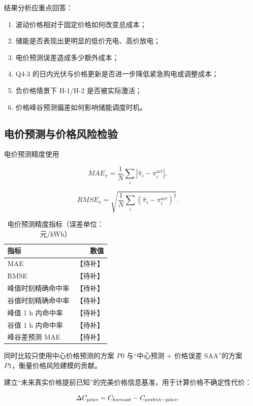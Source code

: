 结果分析应重点回答：

\begin{enumerate}
\item 波动价格相对于固定价格如何改变总成本；
\item 储能是否表现出更明显的低价充电、高价放电；
\item 电价预测误差造成多少额外成本；
\item Q4-3 的日内光伏与价格更新是否进一步降低紧急购电或调整成本；
\item 负价格情景下 H-1/H-2 是否被实际激活；
\item 价格峰谷预测偏差如何影响储能调度时机。
\end{enumerate}

\subsection{电价预测与价格风险检验}

电价预测精度使用

\[
MAE_\pi
=
\frac1N
\sum_i
|\hat\pi_i-\pi_i^{act}|,
\]

\begin{equation}
RMSE_\pi
=
\sqrt{
\frac1N
\sum_i
(\hat\pi_i-\pi_i^{act})^2
}.
\end{equation}

\begin{table}[H]
\centering
{}
\begin{tabular}{lr}
\toprule
指标 & 数值 \\
\midrule
MAE & 【待补】 \\
RMSE & 【待补】 \\
峰值时刻精确命中率 & 【待补】 \\
谷值时刻精确命中率 & 【待补】 \\
峰值 1 h 内命中率 & 【待补】 \\
谷值 1 h 内命中率 & 【待补】 \\
峰谷差预测 MAE & 【待补】 \\
\bottomrule
\end{tabular}
\caption{电价预测精度指标（误差单位：元/kWh）}
\label{tab:12}
\end{table}

同时比较只使用中心价格预测的方案 \(P0\) 与“中心预测 + 价格误差 SAA”的方案 \(P1\)，衡量价格风险建模的贡献。

建立“未来真实价格提前已知”的完美价格信息基准，用于计算价格不确定性代价：

\begin{equation}
\Delta C_{\rm price}
=
C_{\rm forecast}
-
C_{\rm perfect-price}.
\end{equation}


